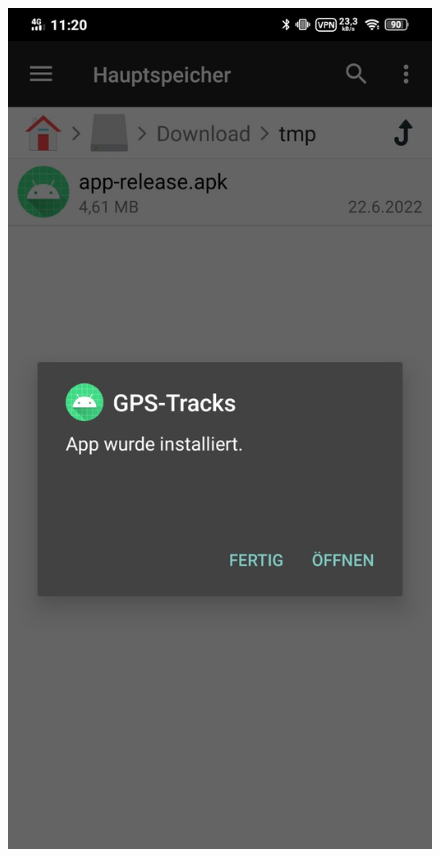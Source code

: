 \documentclass{article}
\begin{document}
\begin{enumerate}
        \begin{figure}[H]
            \includegraphics[scale=0.18]{20.jpg}
            \centering
        \end{figure}
\end{enumerate}
\end{document}
